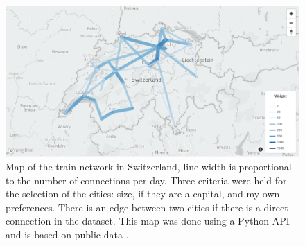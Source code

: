 \documentclass[a4paper,11pt,twoside=semi,openright]{report}
\begin{document}
\begin{figure}[!h] 
\centering
\includegraphics[width=450pt]{figures/mapCFF}
\caption{Map of the train network in Switzerland, line width is proportional to
 the number of connections per day. Three criteria were held for the selection of the cities: size, if they are a capital, and my own preferences. There is an edge between two cities if there is a direct connection in the dataset. This map was done using a Python API \cite{MapBox} and is based on public data \cite{OpenData}. } \label{fig:CFF-map}
\end{figure}
\end{document}
